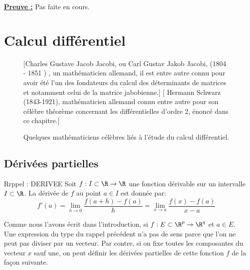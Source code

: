 \documentclass[class=report,crop=false]{standalone}
\begin{document}
\noindent \underline{\bf Preuve :}
Pas faite en cours.

\chapter{Calcul différentiel}



\begin{figure}[!h]
    [Charles Gustave Jacob Jacobi, ou Carl Gustav Jakob Jacobi, (1804  - 1851 ) , un mathématicien allemand, il est entre autre connu pour 
    avoir été l'un des fondateurs du calcul des déterminants de matrices et notamment celui de la matrice jabobienne.]
    {
        \label{fig:jacobi}
    }
    [\color{blue} Hermann Schwarz (1843-1921), mathématicien allemand connu entre autre pour son célèbre théorème concernant les différentielles d'ordre 2, énoncé dans ce chapitre.]
    {
        \label{fig:schwarz}
    }
    \caption{Quelques mathématiciens célèbres liés à l'étude du calcul différentiel.}
    \label{fig:math3}
\end{figure}


\section{Dérivées partielles}
Rrppel : DERIVEE
\textcolor[rgb]{0.73,0.00,0.00}{
Soit $f: I \subset \R \rightarrow \R$ une fonction dérivable sur un intervalle $I \subset \R$. La dérivée de $f$ au point $a \in I$ est donnée par:
\begin{equation*}
f'(a)=\displaystyle \lim_{h \rightarrow 0} \dfrac{f(a+h)-f(a)}{h}=\displaystyle \lim_{x \rightarrow a} \dfrac{f(x)-f(a)}{x-a}
\end{equation*}
}

\noindent Comme nous l'avons écrit dans l'introduction, si $f: E \subset \R^p \rightarrow \R^q$ et 
$a \in E$. Une expression du type du rappel précédent n'a pas de sens parce que l'on ne peut pas diviser par un vecteur. Par contre, si on fixe toutes les composantes du vecteur $x$ sauf une, 
on peut définir les dérivées partielles de cette fonction $f$ de la façon suivante.
\end{document}
